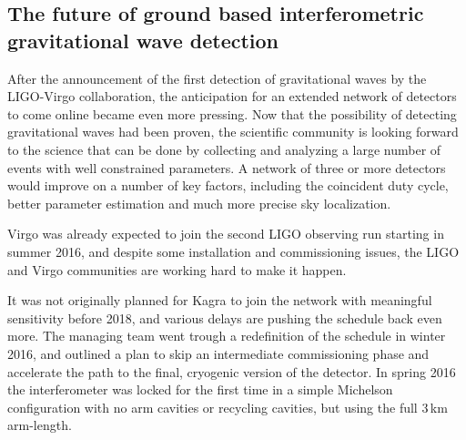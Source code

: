 \subsection{The future of ground based interferometric gravitational wave detection}\label{subsec:future}

After the announcement of the first detection of gravitational waves by the LIGO-Virgo collaboration, the anticipation for an extended network of detectors to come online became even more pressing. Now that the possibility of detecting gravitational waves had been proven, the scientific community is looking forward to the science that can be done by collecting and analyzing a large number of events with well constrained parameters. A network of three or more detectors would improve on a number of key factors, including the  coincident duty cycle, better parameter estimation and much more precise sky localization.

Virgo was already expected to join the second LIGO observing run starting in summer 2016, and despite some installation and commissioning issues, the LIGO and Virgo communities are working hard to make it happen.

It was not originally planned for Kagra to join the network with meaningful sensitivity before 2018, and various delays are pushing the schedule back even more. 
The managing team went trough a redefinition of the schedule in winter 2016, and outlined a plan to skip an intermediate commissioning phase and accelerate the path to the final, cryogenic version of the detector. 
In spring 2016 the interferometer was locked for the first time in a simple Michelson configuration with no arm cavities or recycling cavities, but using the full 3\,km arm-length.

